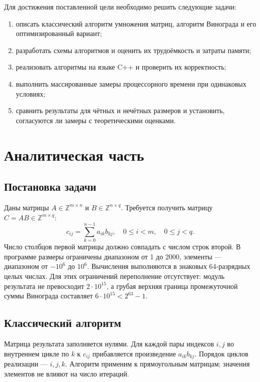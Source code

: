 \documentclass[14pt,a4paper]{extarticle}
\numberwithin{equation}{section}
\begin{document}
Для достижения поставленной цели необходимо решить следующие задачи:
\begin{enumerate}
\item описать классический алгоритм умножения матриц, алгоритм Винограда и его оптимизированный вариант;
\item разработать схемы алгоритмов и оценить их трудоёмкость и затраты памяти;
\item реализовать алгоритмы на языке C++ и проверить их корректность;
\item выполнить массированные замеры процессорного времени при одинаковых условиях;
\item сравнить результаты для чётных и нечётных размеров и установить, согласуются ли замеры с теоретическими оценками.
\end{enumerate}

\clearpage\section{Аналитическая часть}
\subsection{Постановка задачи}
Даны матрицы $A\in\mathbb{Z}^{m\times n}$ и $B\in\mathbb{Z}^{n\times q}$. Требуется получить матрицу $C=AB\in\mathbb{Z}^{m\times q}$:
\begin{equation}\label{eq:classic}
c_{ij}=\sum_{k=0}^{n-1}a_{ik}b_{kj},\quad 0\le i<m,\quad 0\le j<q.
\end{equation}
Число столбцов первой матрицы должно совпадать с числом строк второй. В программе размеры ограничены диапазоном от 1 до 2000, элементы — диапазоном от $-10^6$ до $10^6$. Вычисления выполняются в знаковых 64-разрядных целых числах. Для этих ограничений переполнение отсутствует: модуль результата не превосходит $2\cdot10^{15}$, а грубая верхняя граница промежуточной суммы Винограда составляет $6\cdot10^{15}<2^{63}-1$.

\subsection{Классический алгоритм}
Матрица результата заполняется нулями. Для каждой пары индексов $i,j$ во внутреннем цикле по $k$ к $c_{ij}$ прибавляется произведение $a_{ik}b_{kj}$. Порядок циклов реализации — $i,j,k$. Алгоритм применим к прямоугольным матрицам; значения элементов не влияют на число итераций.
\end{document}

